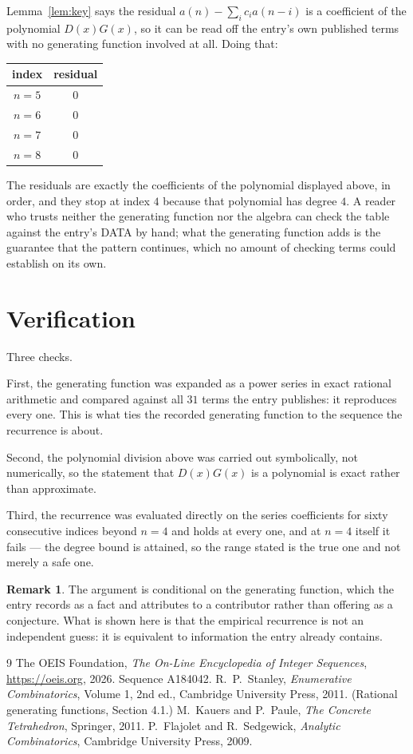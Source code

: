\documentclass[11pt,a4paper]{article}
\theoremstyle{plain}
\theoremstyle{definition}
\newtheorem{remark}[theorem]{Remark}
\begin{document}
Lemma~\ref{lem:key} says the residual $a(n)-\sum_ic_ia(n-i)$ is a coefficient of the
polynomial $D(x)G(x)$, so it can be read off the entry's own published terms with no
generating function involved at all. Doing that:
\begin{center}
\begin{tabular}{cc}
index & residual \\ \hline
$n=5$ & $0$ \\
$n=6$ & $0$ \\
$n=7$ & $0$ \\
$n=8$ & $0$
\end{tabular}
\end{center}
The residuals are exactly the coefficients of the polynomial displayed above, in order, and
they stop at index $4$ because that polynomial has degree $4$. A reader who trusts
neither the generating function nor the algebra can check the table against the entry's DATA
by hand; what the generating function adds is the guarantee that the pattern continues, which
no amount of checking terms could establish on its own.

\section{Verification}

Three checks.

First, the generating function was expanded as a power series in exact rational arithmetic and
compared against all $31$ terms the entry publishes: it reproduces every one. This is
what ties the recorded generating function to the sequence the recurrence is about.

Second, the polynomial division above was carried out symbolically, not numerically, so the
statement that $D(x)G(x)$ is a polynomial is exact rather than approximate.

Third, the recurrence was evaluated directly on the series coefficients for sixty consecutive
indices beyond $n=4$ and holds at every one, and at $n=4$ itself it fails --- the
degree bound is attained, so the range stated is the true one and not merely a safe one.

\begin{remark}
The argument is conditional on the generating function, which the entry records as a fact and
attributes to a contributor rather than offering as a conjecture. What is shown here is that
the empirical recurrence is not an independent guess: it is equivalent to information the
entry already contains.
\end{remark}

\begin{thebibliography}{9}
 The OEIS Foundation, \emph{The On-Line Encyclopedia of Integer
Sequences}, \url{https://oeis.org}, 2026. Sequence A184042.
 R.~P.~Stanley, \emph{Enumerative Combinatorics}, Volume 1, 2nd ed.,
Cambridge University Press, 2011. (Rational generating functions, Section 4.1.)
 M.~Kauers and P.~Paule, \emph{The Concrete Tetrahedron}, Springer, 2011.
 P.~Flajolet and R.~Sedgewick, \emph{Analytic Combinatorics}, Cambridge
University Press, 2009.
\end{thebibliography}
\end{document}
